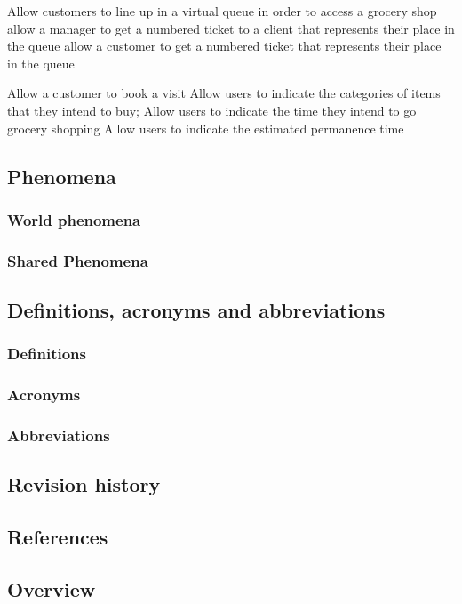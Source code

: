 Allow customers to line up in a virtual queue in order to access a grocery shop
allow a manager to get a numbered ticket to a client that represents their place in the queue
allow a customer to get a numbered ticket that represents their place in the queue

Allow a customer to book a visit
Allow users to indicate the categories of items that they intend to buy;
Allow users to indicate the time they intend to go grocery shopping
Allow users to indicate the estimated permanence time 
\subsection{Phenomena}
\subsubsection{World phenomena}
\subsubsection{Shared Phenomena}
\subsection{Definitions, acronyms and abbreviations}
\subsubsection{Definitions}
\subsubsection{Acronyms}
\subsubsection{Abbreviations}
\subsection{Revision history}
\subsection{References}
\subsection{Overview}